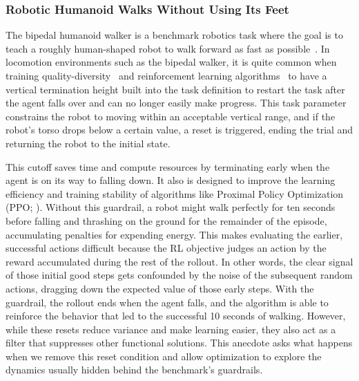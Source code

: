 \subsubsection{Robotic Humanoid Walks Without Using Its Feet~\citep{batra2024proximalpolicygradientarborescence}}
\label{sec:ppga}

The bipedal humanoid walker is a benchmark robotics task where the goal is to teach a roughly human-shaped robot to walk forward as fast as possible~\citep{todorov2012mujoco}.
In locomotion environments such as the bipedal walker, it is quite common when training quality-diversity~\citep{mouret2015illuminating} and reinforcement learning algorithms~\citep{sutton2018reinforcement} to have a vertical termination height built into the task definition to restart the task after the agent falls over and can no longer easily make progress.
This task parameter constrains the robot to moving within an acceptable vertical range, and if the robot's torso drops below a certain value, a reset is triggered, ending the trial and returning the robot to the initial state.

This cutoff saves time and compute resources by terminating early when the agent is on its way to falling down.
It also is designed to improve the learning efficiency and training stability of algorithms like Proximal Policy Optimization (PPO; \citealp{schulman2017proximalpolicyoptimizationalgorithms}).
Without this guardrail, a robot might walk perfectly for ten seconds before falling and thrashing on the ground for the remainder of the episode, accumulating penalties for expending energy. 
This makes evaluating the earlier, successful actions difficult because the RL objective judges an action by the reward accumulated during the rest of the rollout. 
In other words, the clear signal of those initial good steps gets confounded by the noise of the subsequent random actions, dragging down the expected value of those early steps.
With the guardrail, the rollout ends when the agent falls, and the algorithm is able to reinforce the behavior that led to the successful 10 seconds of walking.
However, while these resets reduce variance and make learning easier, they also act as a filter that suppresses other functional solutions.
This anecdote asks what happens when we remove this reset condition and allow optimization to explore the dynamics usually hidden behind the benchmark's guardrails.

